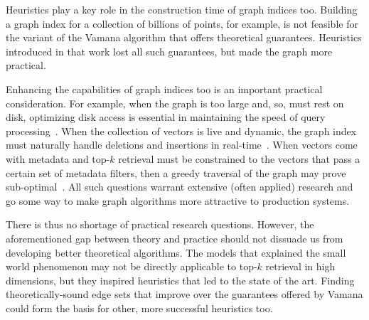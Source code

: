 Heuristics play a key role in the construction time of graph indices too.
Building a graph index for a collection of billions of points, for example,
is not feasible for the variant of the Vamana algorithm that offers theoretical
guarantees. Heuristics introduced in that work lost all such guarantees,
but made the graph more practical.

Enhancing the capabilities of graph indices too is an important practical
consideration. For example, when the graph is too large and, so, must rest
on disk, optimizing disk access is essential in maintaining the speed of
query processing~\citep{diskann}. When the collection of vectors is live
and dynamic, the graph index must naturally handle deletions and insertions
in real-time~\citep{singh2021freshdiskann}. When vectors come with metadata
and top-$k$ retrieval must be constrained to the vectors that pass
a certain set of metadata filters, then a greedy traversal of the graph
may prove sub-optimal~\citep{filtered-diskann2023}. All such questions
warrant extensive (often applied) research and go some way to make
graph algorithms more attractive to production systems.

There is thus no shortage of practical research questions.
However, the aforementioned gap between theory and practice should not
dissuade us from developing better theoretical algorithms.
The models that explained the small world phenomenon may not be directly
applicable to top-$k$ retrieval in high dimensions, but they inspired
heuristics that led to the state of the art. Finding theoretically-sound
edge sets that improve over the guarantees offered by Vamana
could form the basis for other, more successful heuristics too.



